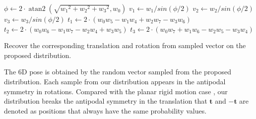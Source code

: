 \documentclass[micromachines,article,accept,pdftex,moreauthors]{Definitions/mdpi}
\DeclareMathOperator{\atantwo}{atan2}
\begin{document}
\begin{algorithm}[H]
\DontPrintSemicolon
{}
${\phi} \leftarrow {2 \cdot \atantwo(\sqrt{{w_1}^2 + {w_2}^2 + {w_3}^2}, w_0)}$ \;
${v_1} \leftarrow {w_1/sin(\phi/2)}$ \;
${v_2} \leftarrow {w_2/sin(\phi/2)}$ \;
${v_3} \leftarrow {w_3/sin(\phi/2)}$ \;
${t_1} \leftarrow {2 \cdot ({w_0}{w_5} - {w_1}{w_4} + {w_2}{w_7} - {w_3}{w_6}) }$ \;
${t_2} \leftarrow {2 \cdot ({w_0}{w_6} - {w_1}{w_7} - {w_2}{w_4} + {w_3}{w_5}) }$ \;
${t_3} \leftarrow {2 \cdot ({w_0}{w_7} + {w_1}{w_6} - {w_2}{w_5} - {w_3}{w_4})}$ \;

\caption{Recover the corresponding translation and rotation from sampled vector on the proposed distribution.} \label{algo1}
\end{algorithm}

The 6D pose is obtained by the random vector sampled from the proposed distribution. Each sample from our distribution appears in the antipodal symmetry in rotations. Compared with the planar rigid motion case \cite{gilitschenskiNewProbabilityDistribution2014}, our distribution breaks the antipodal symmetry in the translation that $\boldsymbol{t}$ and $-\boldsymbol{t}$ are denoted as positions that always have the same probability values.
\end{document}
